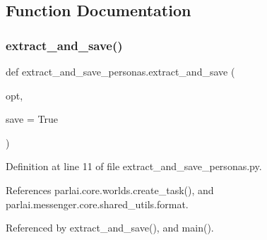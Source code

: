 \subsection{Function Documentation}
\mbox{\label{namespaceextract__and__save__personas_a8de429c2a432ebaa5185e44fe39a1f73}} 
\subsubsection{\texorpdfstring{extract\+\_\+and\+\_\+save()}{extract\_and\_save()}\hspace{0.1cm}{\footnotesize\ttfamily [1/2]}}
{\footnotesize\ttfamily def extract\+\_\+and\+\_\+save\+\_\+personas.\+extract\+\_\+and\+\_\+save (\begin{DoxyParamCaption}\item[{}]{opt,  }\item[{}]{save = {\ttfamily True} }\end{DoxyParamCaption})}



Definition at line 11 of file extract\+\_\+and\+\_\+save\+\_\+personas.\+py.



References parlai.\+core.\+worlds.\+create\+\_\+task(), and parlai.\+messenger.\+core.\+shared\+\_\+utils.\+format.



Referenced by extract\+\_\+and\+\_\+save(), and main().

